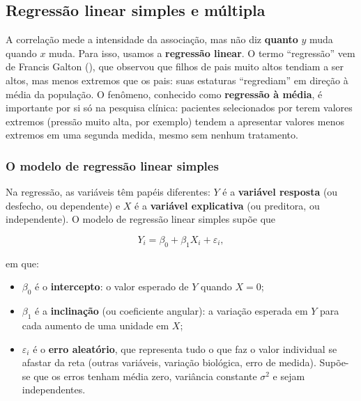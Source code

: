 \documentclass[
]{book}
\providecommand{\tightlist}{%
  \setlength{\itemsep}{0pt}\setlength{\parskip}{0pt}}
\begin{document}
\subsection{Regressão linear simples e múltipla}\label{regressuxe3o-linear-simples-e-muxfaltipla}

A correlação mede a intensidade da associação, mas não diz \textbf{quanto} \(y\) muda quando \(x\) muda. Para isso, usamos a \textbf{regressão linear}. O termo ``regressão'' vem de Francis Galton (), que observou que filhos de pais muito altos tendiam a ser altos, mas menos extremos que os pais: suas estaturas ``regrediam'' em direção à média da população. O fenômeno, conhecido como \textbf{regressão à média}, é importante por si só na pesquisa clínica: pacientes selecionados por terem valores extremos (pressão muito alta, por exemplo) tendem a apresentar valores menos extremos em uma segunda medida, mesmo sem nenhum tratamento.

\subsubsection{O modelo de regressão linear simples}\label{o-modelo-de-regressuxe3o-linear-simples}

Na regressão, as variáveis têm papéis diferentes: \(Y\) é a \textbf{variável resposta} (ou desfecho, ou dependente) e \(X\) é a \textbf{variável explicativa} (ou preditora, ou independente). O modelo de regressão linear simples supõe que

\begin{equation}
Y_i = \beta_0 + \beta_1 X_i + \varepsilon_i,
\label{eq:reg-simples}
\end{equation}

em que:

\begin{itemize}
\tightlist
\item
  \(\beta_0\) é o \textbf{intercepto}: o valor esperado de \(Y\) quando \(X = 0\);
\item
  \(\beta_1\) é a \textbf{inclinação} (ou coeficiente angular): a variação esperada em \(Y\) para cada aumento de uma unidade em \(X\);
\item
  \(\varepsilon_i\) é o \textbf{erro aleatório}, que representa tudo o que faz o valor individual se afastar da reta (outras variáveis, variação biológica, erro de medida). Supõe-se que os erros tenham média zero, variância constante \(\sigma^2\) e sejam independentes.
\end{itemize}
\end{document}
